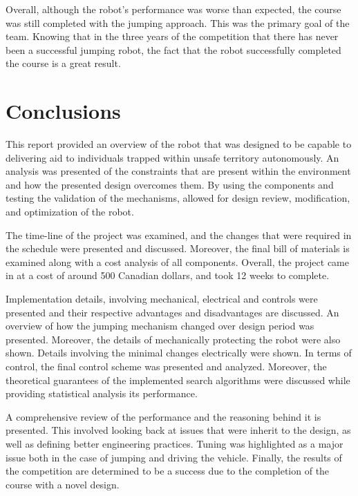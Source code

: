 \documentclass[ece]{uw-wkrpt}
\let\oldsection\section
\renewcommand\section{\clearpage\oldsection}
\begin{document}
Overall, although the robot’s performance was worse than expected, the course was still completed with the jumping approach. This was the primary goal of the team. Knowing that in the three years of the competition that there has never been a successful jumping robot, the fact that the robot successfully completed the course is a great result. 

\section{Conclusions}

This report provided an overview of the robot that was designed to be capable to delivering aid to individuals trapped within unsafe territory autonomously. An analysis was presented of the constraints that are present within the environment and how the presented design overcomes them. By using the components and testing the validation of the mechanisms, allowed for design review, modification, and optimization of the robot. 

The time-line of the project was examined, and the changes that were required in the schedule were presented and discussed. Moreover, the final bill of materials is examined along with a cost analysis of all components. Overall, the project came in at a cost of around 500 Canadian dollars, and took 12 weeks to complete. 

Implementation details, involving mechanical, electrical and controls were presented and their respective advantages and disadvantages are discussed. An overview of how the jumping mechanism changed over design period was presented. Moreover, the details of mechanically protecting the robot were also shown. Details involving the minimal changes electrically were shown. In terms of control, the final control scheme was presented and analyzed. Moreover, the theoretical guarantees of the implemented search algorithms were discussed while providing statistical analysis its performance. 

A comprehensive review of the performance and the reasoning behind it is presented. This involved looking back at issues that were inherit to the design, as well as defining better engineering practices. Tuning was highlighted as a major issue both in the case of jumping and driving the vehicle. Finally, the results of the competition are determined to be a success due to the completion of the course with a novel design. 

\end{document}
